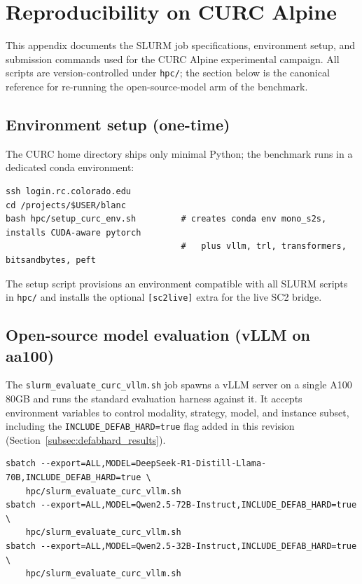 \documentclass{article}
\theoremstyle{definition}
\begin{document}

\section{Reproducibility on CURC Alpine}\label{app:curc_repro}

This appendix documents the SLURM job specifications, environment setup, and submission commands used for the CURC Alpine experimental campaign. All scripts are version-controlled under \texttt{hpc/}; the section below is the canonical reference for re-running the open-source-model arm of the benchmark.

\subsection{Environment setup (one-time)}

The CURC home directory ships only minimal Python; the benchmark runs in a dedicated conda environment:

\begin{verbatim}
ssh login.rc.colorado.edu
cd /projects/$USER/blanc
bash hpc/setup_curc_env.sh         # creates conda env mono_s2s, installs CUDA-aware pytorch
                                   #   plus vllm, trl, transformers, bitsandbytes, peft
\end{verbatim}

The setup script provisions an environment compatible with all SLURM scripts in \texttt{hpc/} and installs the optional \texttt{[sc2live]} extra for the live SC2 bridge.

\subsection{Open-source model evaluation (vLLM on aa100)}

The \texttt{slurm\_evaluate\_curc\_vllm.sh} job spawns a vLLM server on a single A100 80GB and runs the standard evaluation harness against it. It accepts environment variables to control modality, strategy, model, and instance subset, including the \texttt{INCLUDE\_DEFAB\_HARD=true} flag added in this revision (Section~\ref{subsec:defabhard_results}).

\begin{verbatim}
sbatch --export=ALL,MODEL=DeepSeek-R1-Distill-Llama-70B,INCLUDE_DEFAB_HARD=true \
    hpc/slurm_evaluate_curc_vllm.sh
sbatch --export=ALL,MODEL=Qwen2.5-72B-Instruct,INCLUDE_DEFAB_HARD=true \
    hpc/slurm_evaluate_curc_vllm.sh
sbatch --export=ALL,MODEL=Qwen2.5-32B-Instruct,INCLUDE_DEFAB_HARD=true \
    hpc/slurm_evaluate_curc_vllm.sh
\end{verbatim}
\end{document}
